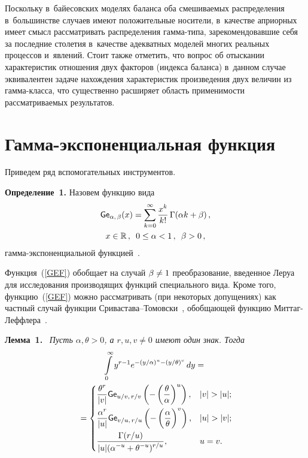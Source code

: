\begin{multicols}{2}
Поскольку в~байесовских моделях баланса оба смешиваемых распределения 
в~большинстве случаев имеют положительные носители, в~качестве априорных имеет 
смысл рассматривать распределения гамма-типа, зарекомендовавшие себя за 
последние столетия в~качестве адекватных моделей многих реальных процессов 
и~явлений. Стоит также отметить, что вопрос об отыскании характеристик отношения 
двух факторов (индекса баланса) в~данном случае эквивалентен задаче нахождения 
характеристик произведения двух величин из гам\-ма-клас\-са, что существенно 
расширяет область применимости рассматриваемых результатов.

\section{Гамма-экспоненциальная функция}

Приведем ряд вспомогательных инструментов.

\smallskip

\noindent
\textbf{Определение~1.}
Назовем функцию вида
\begin{multline}
\label{GEF}
{\sf Ge}_{\alpha,\, \beta} (x) = \sum\limits_{k=0}^{\infty}\displaystyle\frac{\displaystyle x^k\mathstrut}{\displaystyle k!\mathstrut}\,
 \Gamma(\alpha k + 
\beta)\,, \\
 x\in\mathbb{R}\,, \enskip 0\le\alpha<1\,, \enskip \beta> 0\,,
\end{multline}
гамма-экспоненциальной функ\-ци\-ей~\cite{KuTi2017}.


\smallskip

Функция~(\ref{GEF}) обобщает на случай $\beta\hm\neq1$ преобразование, введенное 
Леруа~\cite{LeRoy1900_1} для исследования производящих функций специального 
вида. Кроме того, функцию~(\ref{GEF}) можно рассматривать (при некоторых 
допущениях) как частный случай функции Сри\-ва\-ста\-ва--То\-мовски~\cite{SrTo2009}, 
обобщающей функцию Мит\-таг-Леф\-фле\-ра~\cite{GoKiMaRo2014}.

\smallskip

\noindent
\textbf{Лемма~1.}\
\textit{ %
Пусть $\alpha,\theta>0$, а $r,u,v\neq0$ имеют один знак. Тогда}
\begin{multline*}
\int\limits_0^{\infty}y^{r-1}e^{-(y/\alpha)^u-(y/\theta)^v} \, dy ={}\\
{}=
 \begin{cases}
   \displaystyle \fr{\theta^{r}}{|v|}{\sf Ge}_{u/v,\,r/v}\left(-
\left(\fr{\theta}{\alpha}\right)^{u}\right), &|v|>|u|;\\[9pt]
   \displaystyle \fr{\alpha^{r}}{|u|}{\sf Ge}_{v/u,\,r/u}\left(-
\left(\fr{\alpha}{\theta}\right)^{v}\right), &|u|>|v|;\\[9pt]
   \displaystyle \fr{\Gamma(r/u)}{|u|(\alpha^{-u}+\theta^{-u})^{r/u}}, 
&u = v.
 \end{cases}
\end{multline*}


\end{multicols}

